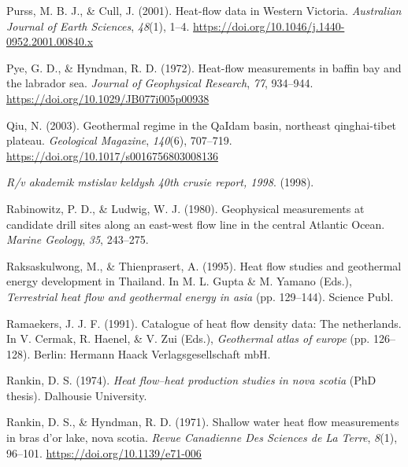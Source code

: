 \documentclass[draft,linenumbers]{agujournal2018}
\begin{document}
\leavevmode{}%
Purss, M. B. J., \& Cull, J. (2001). Heat-flow data in {Western
Victoria}. \emph{Australian Journal of Earth Sciences}, \emph{48}(1),
1--4. \url{https://doi.org/10.1046/j.1440-0952.2001.00840.x}

\leavevmode{}%
Pye, G. D., \& Hyndman, R. D. (1972). Heat-flow measurements in baffin
bay and the labrador sea. \emph{Journal of Geophysical Research},
\emph{77}, 934--944. \url{https://doi.org/10.1029/JB077i005p00938}

\leavevmode{}%
Qiu, N. (2003). Geothermal regime in the QaIdam basin, northeast
qinghai-tibet plateau. \emph{Geological Magazine}, \emph{140}(6),
707--719. \url{https://doi.org/10.1017/s0016756803008136}

\leavevmode{}%
\emph{R/v akademik mstislav keldysh 40th crusie report, 1998}. (1998).

\leavevmode{}%
Rabinowitz, P. D., \& Ludwig, W. J. (1980). Geophysical measurements at
candidate drill sites along an east-west flow line in the central
{Atlantic Ocean}. \emph{Marine Geology}, \emph{35}, 243--275.

\leavevmode{}%
Raksaskulwong, M., \& Thienprasert, A. (1995). Heat flow studies and
geothermal energy development in {Thailand}. In M. L. Gupta \& M. Yamano
(Eds.), \emph{Terrestrial heat flow and geothermal energy in asia} (pp.
129--144). Science Publ.

\leavevmode{}%
Ramaekers, J. J. F. (1991). Catalogue of heat flow density data: The
netherlands. In V. Cermak, R. Haenel, \& V. Zui (Eds.), \emph{Geothermal
atlas of europe} (pp. 126--128). Berlin: Hermann Haack
Verlagsgesellschaft mbH.

\leavevmode{}%
Rankin, D. S. (1974). \emph{Heat flow--heat production studies in nova
scotia} (PhD thesis). Dalhousie University.

\leavevmode{}%
Rankin, D. S., \& Hyndman, R. D. (1971). Shallow water heat flow
measurements in bras d'or lake, nova scotia. \emph{Revue Canadienne Des
Sciences de La Terre}, \emph{8}(1), 96--101.
\url{https://doi.org/10.1139/e71-006}
\end{document}
